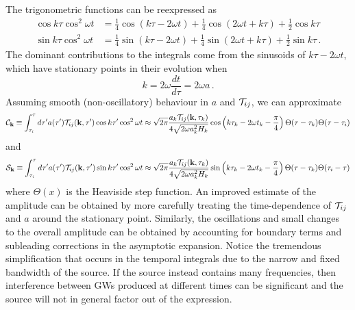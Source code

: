 \documentclass{revtex4}
\begin{document}
The trigonometric functions can be reexpressed as
\begin{subequations}
\begin{align}
  \cos k\tau\cos^2\omega t &= \frac{1}{4}\cos(k\tau-2\omega t) + \frac{1}{4}\cos(2\omega t+k\tau) + \frac{1}{2}\cos k\tau \\
  \sin k\tau\cos^2\omega t &= \frac{1}{4}\sin(k\tau-2\omega t) + \frac{1}{4}\sin(2\omega t+k\tau) + \frac{1}{2}\sin k\tau \, .
\end{align}
\end{subequations}
The dominant contributions to the integrals come from the sinusoids of $k\tau - 2\omega t$, which have stationary points in their evolution when
\begin{equation}
  k = 2\omega\frac{dt}{d\tau} = 2\omega a \, .
\end{equation}
Assuming smooth (non-oscillatory) behaviour in $a$ and $\mathcal{T}_{ij}$, we can approximate
\begin{equation}
  \label{eqn:cosine-int}
  \mathcal{C}_{{\bf k}} \equiv \int_{\tau_i}^\tau d\tau' a(\tau')\mathcal{T}_{ij}({\bf k},\tau')\cos k\tau'\cos^2\omega t \approx \sqrt{2\pi}\frac{a_k\mathcal{T}_{ij}({\bf k},\tau_k)}{4\sqrt{2\omega a^2_kH_k}}\cos\left(k\tau_k - 2\omega t_k -\frac{\pi}{4}\right)\Theta(\tau - \tau_k)\Theta(\tau-\tau_i)
\end{equation}
and
\begin{equation}
  \label{eqn:sine-int}
  \mathcal{S}_{{\bf k}} \equiv \int_{\tau_i}^\tau d\tau' a(\tau')\mathcal{T}_{ij}({{\bf k}},\tau')\sin k\tau'\cos^2\omega t \approx \sqrt{2\pi}\frac{a_k\mathcal{T}_{ij}({\bf k},\tau_k)}{4\sqrt{2\omega a^2_kH_k}}\sin\left(k\tau_k - 2\omega t_k -\frac{\pi}{4}\right)\Theta(\tau - \tau_k)\Theta(\tau_i-\tau)
\end{equation}
where $\Theta(x)$ is the Heaviside step function.
An improved estimate of the amplitude can be obtained by more carefully treating the time-dependence of $\mathcal{T}_{ij}$ and $a$ around the stationary point.
Similarly, the oscillations and small changes to the overall amplitude can be obtained by accounting for boundary terms and subleading corrections in the asymptotic expansion.
Notice the tremendous simplification that occurs in the temporal integrals due to the narrow and fixed bandwidth of the source.
If the source instead contains many frequencies, then interference between GWs produced at different times can be significant and the source will not in general factor out of the expression.
\end{document}
